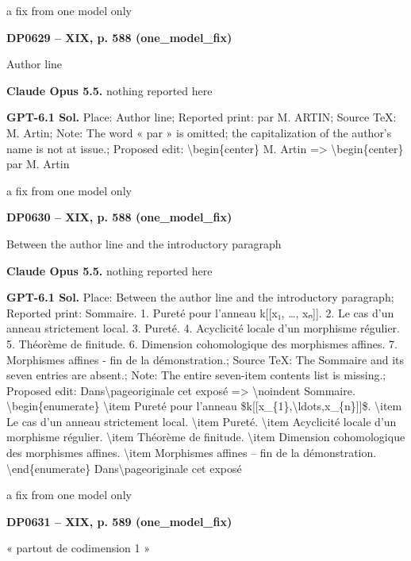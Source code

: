 a fix from one model only\par
\par\noindent\hypertarget{DP0629}{}\textbf{DP0629 -- XIX, p. 588 (one\_model\_fix)}\par
Author line\par
\textbf{Claude Opus 5.5.} nothing reported here\par
\textbf{GPT-6.1 Sol.} Place: Author line; Reported print: par M. ARTIN; Source TeX: M. Artin; Note: The word « par » is omitted; the capitalization of the author's name is not at issue.; Proposed edit: \textbackslash{}begin\{center\} M. Artin =\allowbreak > \textbackslash{}begin\{center\} par M. Artin\par
a fix from one model only\par
\par\noindent\hypertarget{DP0630}{}\textbf{DP0630 -- XIX, p. 588 (one\_model\_fix)}\par
Between the author line and the introductory paragraph\par
\textbf{Claude Opus 5.5.} nothing reported here\par
\textbf{GPT-6.1 Sol.} Place: Between the author line and the introductory paragraph; Reported print: Sommaire. 1. Pureté pour l'anneau k[[x₁, …, xₙ]]. 2. Le cas d'un anneau strictement local. 3. Pureté. 4. Acyclicité locale d'un morphisme régulier. 5. Théorème de finitude. 6. Dimension cohomologique des morphismes affines. 7. Morphismes affines - fin de la démonstration.; Source TeX: The Sommaire and its seven entries are absent.; Note: The entire seven-item contents list is missing.; Proposed edit: Dans\textbackslash{}pageoriginale cet exposé =\allowbreak > \textbackslash{}noindent Sommaire. \textbackslash{}begin\{enumerate\} \textbackslash{}item Pureté pour l'anneau \$k[[x\_\{1\},\textbackslash{}ldots,x\_\{n\}]]\$. \textbackslash{}item Le cas d'un anneau strictement local. \textbackslash{}item Pureté. \textbackslash{}item Acyclicité locale d'un morphisme régulier. \textbackslash{}item Théorème de finitude. \textbackslash{}item Dimension cohomologique des morphismes affines. \textbackslash{}item Morphismes affines -- fin de la démonstration. \textbackslash{}end\{enumerate\}  Dans\textbackslash{}pageoriginale cet exposé\par
a fix from one model only\par
\par\noindent\hypertarget{DP0631}{}\textbf{DP0631 -- XIX, p. 589 (one\_model\_fix)}\par
« partout de codimension 1 »\par
